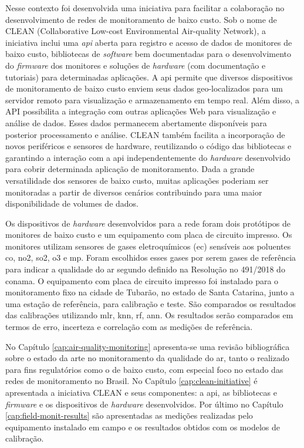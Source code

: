 Nesse contexto foi desenvolvida uma iniciativa para facilitar a colaboração no desenvolvimento de redes de monitoramento de baixo custo. Sob o nome de CLEAN (Collaborative Low-cost Environmental Air-quality Network), a iniciativa inclui uma \textit{api} aberta para registro e acesso de dados de monitores de baixo custo, bibliotecas de \textit{software} bem documentadas para o desenvolvimento do \textit{firmware} dos monitores e soluções de \textit{hardware} (com documentação e tutoriais) para determinadas aplicações. A \acrshort{api} permite que diversos dispositivos de monitoramento de baixo custo enviem seus dados geo-localizados para um servidor remoto para visualização e armazenamento em tempo real. Além disso, a API possibilita a integração com outras aplicações Web para visualização e análise de dados. Esses dados permanecem abertamente disponíveis para posterior processamento e análise. CLEAN também facilita a incorporação de novos periféricos e sensores de hardware, reutilizando o código das bibliotecas e garantindo a interação com a \acrshort{api} independentemente do \textit{hardware} desenvolvido para cobrir determinada aplicação de monitoramento. Dada a grande versatilidade dos sensores de baixo custo, muitas aplicações poderiam ser monitoradas a partir de diversos cenários contribuindo para uma maior disponibilidade de volumes de dados.

Os dispositivos de \textit{hardware} desenvolvidos para a rede foram dois protótipos de monitores de baixo custo e um equipamento com placa de circuito impresso. Os monitores utilizam sensores de gases eletroquímicos (\gls{ec}) sensíveis aos poluentes \acrshort{co}, \acrshort{no2}, \acrshort{so2}, \acrshort{o3} e \acrshort{mp}. Foram escolhidos esses gases por serem gases de referência para indicar a qualidade do ar segundo definido na Resolução no 491/2018 do \gls{conama}. O equipamento com placa de circuito impresso foi instalado para o monitoramento fixo na cidade de Tubarão, no estado de Santa Catarina, junto a uma estação de referência, para calibração e teste. São comparados os resultados das calibrações utilizando \gls{mlr}, \gls{knn}, \gls{rf}, \gls{ann}. Os resultados serão comparados em termos de erro, incerteza e correlação com as medições de referência. 

No Capítulo \ref{cap:air-quality-monitoring} apresenta-se uma revisão bibliográfica sobre o estado da arte no monitoramento da qualidade do ar, tanto o realizado para fins regulatórios como o de baixo custo, com especial foco no estado das redes de monitoramento no Brasil. No Capítulo \ref{cap:clean-initiative} é apresentada a iniciativa CLEAN e seus componentes: a \acrshort{api}, as bibliotecas e \textit{firmware} e os dispositivos de \textit{hardware} desenvolvidos. Por último no Capítulo \ref{cap:field-monit-results} são apresentadas as medições realizadas pelo equipamento instalado em campo e os resultados obtidos com os modelos de calibração.